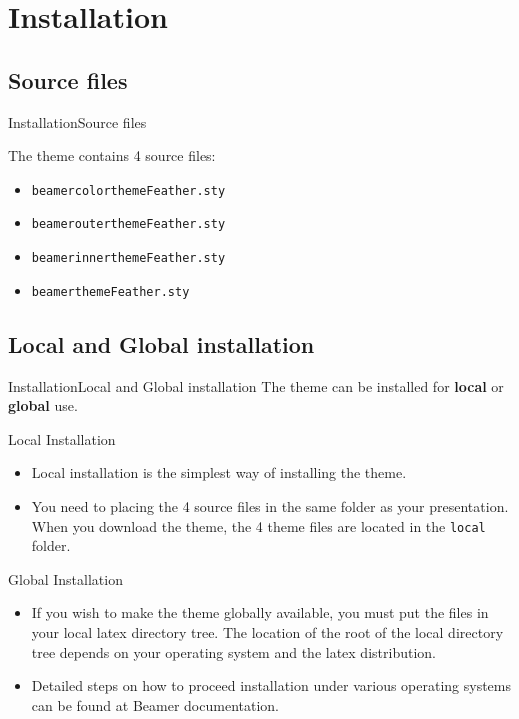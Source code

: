 \documentclass[aspectratio=169,10pt,xcolor={dvipsnames}]{beamer}
\begin{document}
\section{Installation}
\subsection{Source files}
\begin{frame}{Installation}{Source files}

\begin{block}{}
The theme contains 4 source files:
  \begin{itemize}
    \item {\tt beamercolorthemeFeather.sty}
    \item {\tt beamerouterthemeFeather.sty}
    \item {\tt beamerinnerthemeFeather.sty}
    \item {\tt beamerthemeFeather.sty}
  \end{itemize}
\end{block}
\end{frame}

\subsection{Local and Global installation}
\begin{frame}{Installation}{Local and Global installation}
  The theme can be installed for \textbf{local} or \textbf{global} use.
  \pause
  \begin{block}{Local Installation}
  \begin{itemize}    
    \item Local installation is the simplest way of installing the theme. 
    \item You need to placing the 4 source files in the same folder as your presentation. When you download the theme, the 4 theme files are located in the {\tt local} folder.
  \end{itemize}
  \end{block}

  \begin{block}{Global Installation}
  \begin{itemize}
     \item If you wish to make the theme globally available, you must put the files in your local latex directory tree. The location of the root of the local directory tree depends on your operating system and the latex distribution. 
     \item Detailed steps on how to proceed installation under various operating systems can be found at Beamer documentation.
  \end{itemize}
  \end{block}
\end{frame}
     
\end{document}
